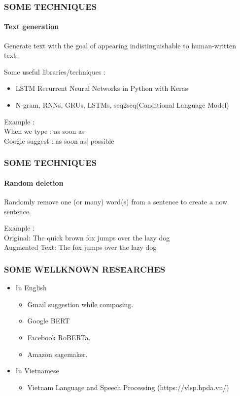 \documentclass[10pt]{beamer}
\begin{document}
\begin{frame}
    \frametitle{\textbf{SOME TECHNIQUES}}
    \framesubtitle{\textbf{Text generation}}
    \begin{definition}
        Generate text with the goal of appearing indistinguishable to human-written text.
    \end{definition}\pause
    Some useful libraries/techniques : 
    \begin{itemize}
        \item LSTM Recurrent Neural Networks in Python with Keras
        \item N-gram, RNNs, GRUs, LSTMs, seq2seq(Conditional Language Model)
    \end{itemize}\pause
    Example :  \\
    When we type : \textsf{as soon as} \\
    \pause
    Google suggest : \textsf{as soon as\left|  {\color[named]{gray} possible}}
\end{frame} 
\begin{frame}
    \frametitle{\textbf{SOME TECHNIQUES}}
    \framesubtitle{\textbf{Random deletion}}
    \begin{definition}
        Randomly remove one (or many) word(s) from a sentence to create a now sentence.
    \end{definition}\pause
    Example : \\
        Original:     \textrm{The quick brown fox jumps over the lazy dog}\\
        Augmented Text:    \textrm{The fox jumps over the lazy dog}
\end{frame}
\begin{frame}
    \frametitle{\textbf{SOME WELLKNOWN RESEARCHES}}
    \begin{itemize}
        \item In English
        \begin{itemize}
            \item Gmail suggestion while composing.
            \item Google BERT
            \item Facebook RoBERTa.
            \item Amazon sagemaker.
        \end{itemize}\pause
        \item In Vietnamese
        \begin{itemize}
            \item Vietnam Language and Speech Processing (https://vlsp.hpda.vn/)
        \end{itemize}
    \end{itemize}
\end{frame}
\end{document}
